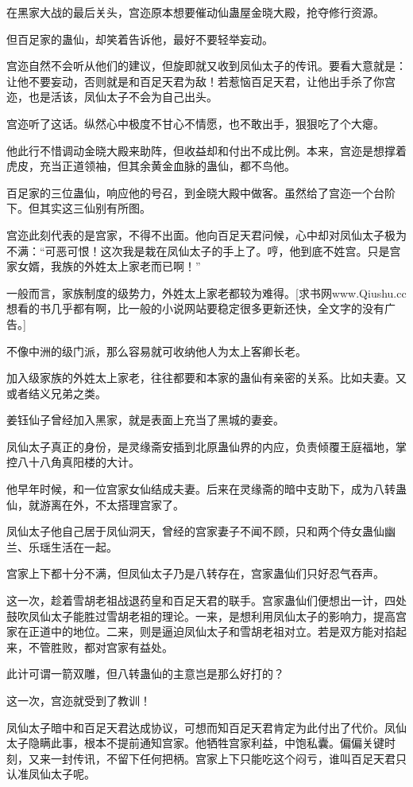 \begin{this_body}
在黑家大战的最后关头，宫迩原本想要催动仙蛊屋金晓大殿，抢夺修行资源。

但百足家的蛊仙，却笑着告诉他，最好不要轻举妄动。

宫迩自然不会听从他们的建议，但旋即就又收到凤仙太子的传讯。要看大意就是：让他不要妄动，否则就是和百足天君为敌！若惹恼百足天君，让他出手杀了你宫迩，也是活该，凤仙太子不会为自己出头。

宫迩听了这话。纵然心中极度不甘心不情愿，也不敢出手，狠狠吃了个大瘪。

他此行不惜调动金晓大殿来助阵，但收益却和付出不成比例。本来，宫迩是想撑着虎皮，充当正道领袖，但其余黄金血脉的蛊仙，都不鸟他。

百足家的三位蛊仙，响应他的号召，到金晓大殿中做客。虽然给了宫迩一个台阶下。但其实这三仙别有所图。

宫迩此刻代表的是宫家，不得不出面。他向百足天君问候，心中却对凤仙太子极为不满：“可恶可恨！这次我是栽在凤仙太子的手上了。哼，他到底不姓宫。只是宫家女婿，我族的外姓太上家老而已啊！”

一般而言，家族制度的级势力，外姓太上家老都较为难得。[求书网www.Qiushu.cc想看的书几乎都有啊，比一般的小说网站要稳定很多更新还快，全文字的没有广告。]

不像中洲的级门派，那么容易就可收纳他人为太上客卿长老。

加入级家族的外姓太上家老，往往都要和本家的蛊仙有亲密的关系。比如夫妻。又或者结义兄弟之类。

姜钰仙子曾经加入黑家，就是表面上充当了黑城的妻妾。

凤仙太子真正的身份，是灵缘斋安插到北原蛊仙界的内应，负责倾覆王庭福地，掌控八十八角真阳楼的大计。

他早年时候，和一位宫家女仙结成夫妻。后来在灵缘斋的暗中支助下，成为八转蛊仙，就游离在外，不太搭理宫家了。

凤仙太子他自己居于凤仙洞天，曾经的宫家妻子不闻不顾，只和两个侍女蛊仙幽兰、乐瑶生活在一起。

宫家上下都十分不满，但凤仙太子乃是八转存在，宫家蛊仙们只好忍气吞声。

这一次，趁着雪胡老祖战退药皇和百足天君的联手。宫家蛊仙们便想出一计，四处鼓吹凤仙太子能胜过雪胡老祖的理论。一来，是想利用凤仙太子的影响力，提高宫家在正道中的地位。二来，则是逼迫凤仙太子和雪胡老祖对立。若是双方能对掐起来，不管胜败，都对宫家有益处。

此计可谓一箭双雕，但八转蛊仙的主意岂是那么好打的？

这一次，宫迩就受到了教训！

凤仙太子暗中和百足天君达成协议，可想而知百足天君肯定为此付出了代价。凤仙太子隐瞒此事，根本不提前通知宫家。他牺牲宫家利益，中饱私囊。偏偏关键时刻，又来一封传讯，不留下任何把柄。宫家上下只能吃这个闷亏，谁叫百足天君只认准凤仙太子呢。


\end{this_body}
